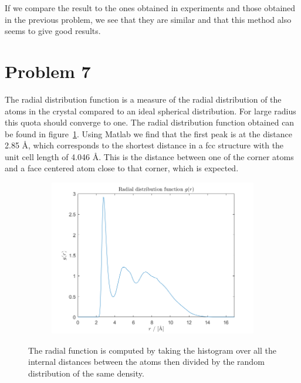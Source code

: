 If we compare the result to the ones obtained in experiments and those obtained in the previous problem, we see that they are similar and that this method also seems to give good results.

\section*{Problem 7}

The radial distribution function is a measure of the radial distribution of the atoms in the crystal compared to an ideal spherical distribution. For large radius this quota should converge to one. The radial distribution function obtained can be found in figure~\ref{fig:radial}. Using Matlab we find that the first peak is at the distance 2.85 \r{A}, which corresponds to the shortest distance in a fcc structure with the unit cell length of 4.046 \r{A}. This is the distance between one of the corner atoms and a face centered atom close to that corner, which is expected.

\begin{figure}[H]
\centering
\captionsetup[subfigure]{justification=centering}
\begin{subfigure}[b]{0.40\textwidth}
	\centering
	\includegraphics[width=\textwidth]{graphics/task7/radial.png}
\end{subfigure}
\caption{The radial function is computed by taking the histogram over all the internal distances between the atoms then divided by the random distribution of the same density.}
\label{fig:radial}
\end{figure}

